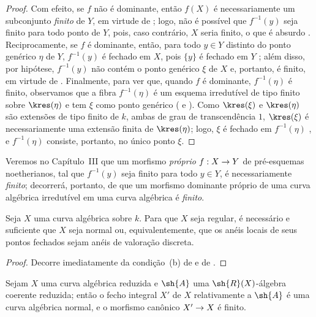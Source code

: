 \documentclass[oneside,10pt]{amsart}
\makeatletter
\newcommand{\ega@arrow}[2]{\mathchoice{#1}{#2}{#2}{#2}}
\renewcommand{\to}{\ega@arrow{\longrightarrow}{\rightarrow}}
\let\EGAOriginalLabel\label
\renewcommand{\label}[1]{\phantomsection\EGAOriginalLabel{#1}}
\makeatother
\begin{document}
\begin{proof}
Com efeito, se $f$ não é dominante, então $f(X)$ é necessariamente um subconjunto \emph{finito} de $Y$, em virtude de ; logo, não é possível que $f^{-1}(y)$ seja finito para todo ponto de $Y$, pois, caso contrário, $X$ seria finito, o que é absurdo .
Reciprocamente, se $f$ é dominante, então, para todo $y\in Y$ distinto do ponto genérico $\eta$ de $Y$, $f^{-1}(y)$ é fechado em $X$, pois $\{y\}$ é fechado em $Y$ ;
além disso, por hipótese, $f^{-1}(y)$ não contém o ponto genérico $\xi$ de $X$ e, portanto, é finito, em virtude de .
Finalmente, para ver que, quando $f$ é dominante, $f^{-1}(\eta)$ é finito, observamos que a fibra $f^{-1}(\eta)$ é um esquema irredutível de tipo finito sobre $\kres(\eta)$ e tem $\xi$ como ponto genérico ( e ).
Como $\kres(\xi)$ e $\kres(\eta)$ são extensões de tipo finito de $k$, ambas de grau de transcendência $1$, $\kres(\xi)$ é necessariamente uma extensão finita de $\kres(\eta)$; logo, $\xi$ é fechado em $f^{-1}(\eta)$ , e $f^{-1}(\eta)$ consiste, portanto, no único ponto $\xi$.
\end{proof}

Veremos no Capítulo~III que um morfismo \emph{próprio} $f:X\to Y$ de pré-esquemas noetherianos, tal que $f^{-1}(y)$ seja finito para todo $y\in Y$, é necessariamente \emph{finito};
decorrerá, portanto, de  que um morfismo dominante próprio de uma curva algébrica irredutível em uma curva algébrica é \emph{finito}.

\begin{corollary}[7.4.5]
\label{II.7.4.5}
Seja $X$ uma curva algébrica sobre $k$.
Para que $X$ seja regular, é necessário e suficiente que $X$ seja normal ou, equivalentemente, que os anéis locais de seus pontos fechados sejam anéis de valoração discreta.
\end{corollary}

\begin{proof}
Decorre imediatamente da condição~(b) de  e de .
\end{proof}

\begin{corollary}[7.4.6]
\label{II.7.4.6}
Sejam $X$ uma curva algébrica reduzida e $\sh{A}$ uma $\sh{R}(X)$-álgebra coerente reduzida;
então o fecho integral $X'$ de $X$ relativamente a $\sh{A}$  é uma curva algébrica normal, e o morfismo canônico $X'\to X$ é finito.
\end{corollary}
\end{document}

